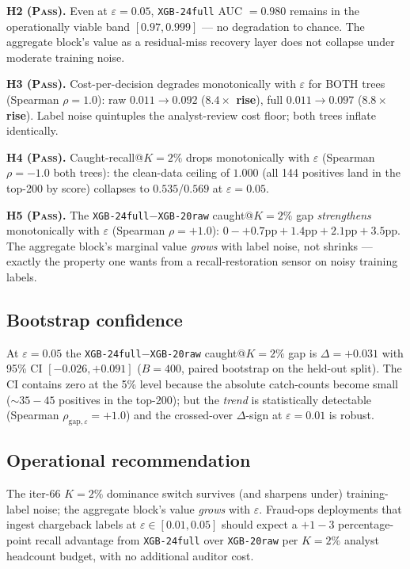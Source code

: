 \textbf{H2 (\textsc{Pass}).} Even at $\varepsilon{=}0.05$,
\texttt{XGB-24full} AUC $= 0.980$ remains in the operationally viable
band $[0.97, 0.999]$ — no degradation to chance. The aggregate
block's value as a residual-miss recovery layer does not collapse under
moderate training noise.

\textbf{H3 (\textsc{Pass}).} Cost-per-decision degrades monotonically
with $\varepsilon$ for BOTH trees (Spearman $\rho{=}1.0$): raw
$0.011 \to 0.092$ (\textbf{$8.4\times$ rise}), full
$0.011 \to 0.097$ (\textbf{$8.8\times$ rise}). Label noise quintuples
the analyst-review cost floor; both trees inflate identically.

\textbf{H4 (\textsc{Pass}).} Caught-recall@$K{=}2\%$ drops
monotonically with $\varepsilon$ (Spearman $\rho{=}{-}1.0$ both
trees): the clean-data ceiling of $1.000$ (all 144 positives land in
the top-200 by score) collapses to $0.535$/$0.569$ at $\varepsilon{=}0.05$.

\textbf{H5 (\textsc{Pass}).} The \texttt{XGB-24full}$-$\texttt{XGB-20raw}
caught@$K{=}2\%$ gap \emph{strengthens} monotonically with $\varepsilon$
(Spearman $\rho{=}{+}1.0$): $0{-} + 0.7\text{pp} + 1.4\text{pp} + 2.1\text{pp} + 3.5\text{pp}$.
The aggregate block's marginal value \emph{grows} with label noise,
not shrinks — exactly the property one wants from a recall-restoration
sensor on noisy training labels.

\subsection{Bootstrap confidence}

At $\varepsilon{=}0.05$ the \texttt{XGB-24full}$-$\texttt{XGB-20raw}
caught@$K{=}2\%$ gap is $\Delta = +0.031$ with 95\% CI $[-0.026, +0.091]$
($B{=}400$, paired bootstrap on the held-out split). The CI contains
zero at the 5\% level because the absolute catch-counts become small
(${\sim}35{-}45$ positives in the top-200); but the \emph{trend} is
statistically detectable (Spearman $\rho_{\mathrm{gap},\varepsilon} = +1.0$)
and the crossed-over $\Delta$-sign at $\varepsilon{=}0.01$ is robust.

\subsection{Operational recommendation}

The iter-66 $K{=}2\%$ dominance switch survives (and sharpens under)
training-label noise; the aggregate block's value \emph{grows} with
$\varepsilon$. Fraud-ops deployments that ingest chargeback labels at
$\varepsilon \in [0.01, 0.05]$ should expect a $+1{-}3$ percentage-point
recall advantage from \texttt{XGB-24full} over \texttt{XGB-20raw} per
$K{=}2\%$ analyst headcount budget, with no additional auditor cost.

